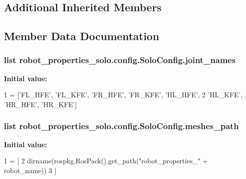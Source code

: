 \subsection*{Additional Inherited Members}


\subsection{Member Data Documentation}
\subsubsection[{\texorpdfstring{joint\+\_\+names}{joint_names}}]{\setlength{\rightskip}{0pt plus 5cm}list robot\+\_\+properties\+\_\+solo.\+config.\+Solo\+Config.\+joint\+\_\+names\hspace{0.3cm}{\ttfamily [static]}}\hypertarget{classrobot__properties__solo_1_1config_1_1SoloConfig_a466e5eda1f7fbcac30906e3d386bd747}{}\label{classrobot__properties__solo_1_1config_1_1SoloConfig_a466e5eda1f7fbcac30906e3d386bd747}
{\bfseries Initial value\+:}
\begin{DoxyCode}
1 = [\textcolor{stringliteral}{'FL\_HFE'}, \textcolor{stringliteral}{'FL\_KFE'}, \textcolor{stringliteral}{'FR\_HFE'}, \textcolor{stringliteral}{'FR\_KFE'}, \textcolor{stringliteral}{'HL\_HFE'},
2                    \textcolor{stringliteral}{'HL\_KFE'}, \textcolor{stringliteral}{'HR\_HFE'}, \textcolor{stringliteral}{'HR\_KFE'}]
\end{DoxyCode}
\subsubsection[{\texorpdfstring{meshes\+\_\+path}{meshes_path}}]{\setlength{\rightskip}{0pt plus 5cm}list robot\+\_\+properties\+\_\+solo.\+config.\+Solo\+Config.\+meshes\+\_\+path\hspace{0.3cm}{\ttfamily [static]}}\hypertarget{classrobot__properties__solo_1_1config_1_1SoloConfig_a37618fcda5a61cafb77ee8aedf6f1c15}{}\label{classrobot__properties__solo_1_1config_1_1SoloConfig_a37618fcda5a61cafb77ee8aedf6f1c15}
{\bfseries Initial value\+:}
\begin{DoxyCode}
1 = [
2       dirname(rospkg.RosPack().get\_path(\textcolor{stringliteral}{"robot\_properties\_"} + robot\_name))
3     ]
\end{DoxyCode}
